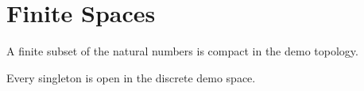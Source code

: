 \chapter{Finite Spaces}

\begin{definition}
\label{def:finite-compact}
\leanok
A finite subset of the natural numbers is compact in the demo topology.
\end{definition}

\begin{lemma}
\label{lem:singleton-open}
Every singleton is open in the discrete demo space.
\leanok
\end{lemma}
